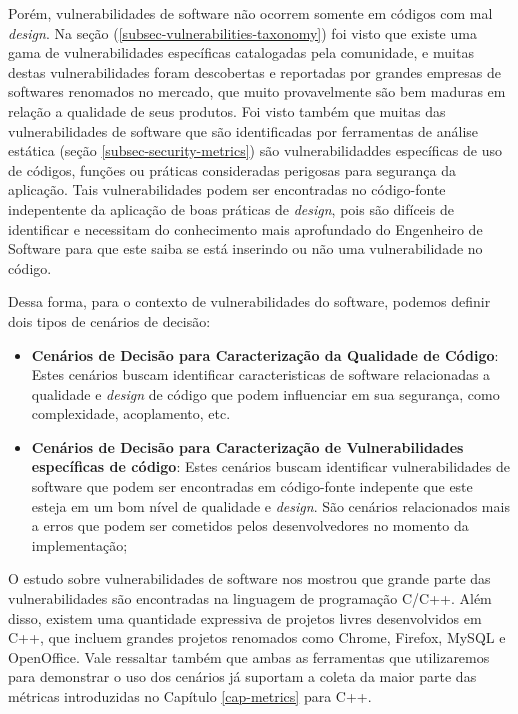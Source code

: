Porém, vulnerabilidades de software não ocorrem somente em códigos com mal \emph{design}. Na seção (\ref{subsec-vulnerabilities-taxonomy}) foi visto que existe uma gama de vulnerabilidades específicas catalogadas pela comunidade, e muitas destas vulnerabilidades foram descobertas e reportadas por grandes empresas de softwares renomados no mercado, que muito provavelmente são bem maduras em relação a qualidade de seus produtos. Foi visto também que muitas das vulnerabilidades de software que são identificadas por ferramentas de análise estática (seção \ref{subsec-security-metrics}) são vulnerabilidaddes específicas de uso de códigos, funções ou práticas consideradas perigosas para segurança da aplicação. Tais vulnerabilidades podem ser encontradas no código-fonte indepentente da aplicação de boas práticas de \emph{design}, pois são difíceis de identificar e necessitam do conhecimento mais aprofundado do Engenheiro de Software para que este saiba se está inserindo ou não uma vulnerabilidade no código.

Dessa forma, para o contexto de vulnerabilidades do software, podemos definir dois tipos de cenários de decisão:

\begin{itemize}
\item \textbf{Cenários de Decisão para Caracterização da Qualidade de Código}: Estes cenários buscam identificar caracteristicas de software relacionadas a qualidade e \emph{design} de código que podem influenciar em sua segurança, como complexidade, acoplamento, etc.

\item \textbf{Cenários de Decisão para Caracterização de Vulnerabilidades específicas de código}: Estes cenários buscam identificar vulnerabilidades de software que podem ser encontradas em código-fonte indepente que este esteja em um bom nível de qualidade e \emph{design}. São cenários relacionados mais a erros que podem ser cometidos pelos desenvolvedores no momento da implementação;
\end{itemize}


O estudo sobre vulnerabilidades de software nos mostrou que grande parte das vulnerabilidades são encontradas na linguagem de programação C/C++. Além disso, existem uma quantidade expressiva de projetos livres desenvolvidos em C++, que incluem grandes projetos renomados como Chrome, Firefox, MySQL e OpenOffice. Vale ressaltar também que ambas as ferramentas que utilizaremos para demonstrar o uso dos cenários já suportam a coleta da maior parte das métricas introduzidas no Capítulo \ref{cap-metrics} para C++.

